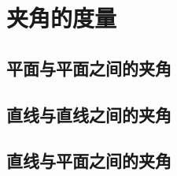 \documentclass[onecolumn]{ctexart}
\begin{document}
\section{夹角的度量}

\subsection{平面与平面之间的夹角}

\subsection{直线与直线之间的夹角}

\subsection{直线与平面之间的夹角}
\end{document}

